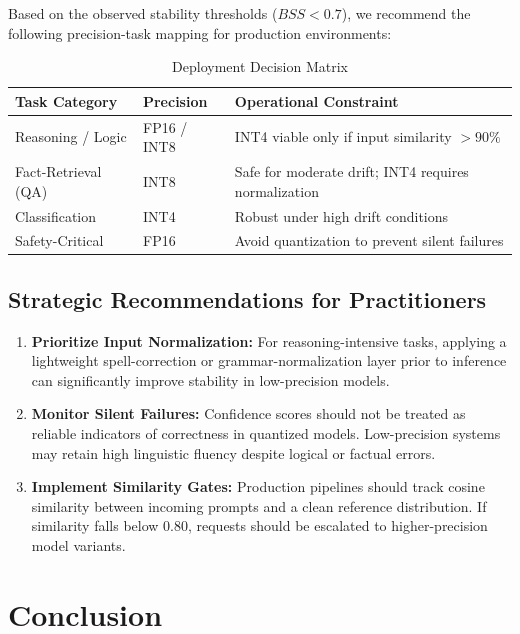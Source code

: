 \documentclass[conference]{IEEEtran}
\begin{document}
Based on the observed stability thresholds ($BSS < 0.7$), we recommend the following precision-task mapping for production environments:

\begin{table}[t]
\centering
\caption{Deployment Decision Matrix}
\begin{tabular}{|p{2.2cm}|p{2.2cm}|p{3.5cm}|}
\hline
\textbf{Task Category} & \textbf{Precision} & \textbf{Operational Constraint} \\
\hline
Reasoning / Logic & FP16 / INT8 & INT4 viable only if input similarity $> 90\%$ \\
\hline
Fact-Retrieval (QA) & INT8 & Safe for moderate drift; INT4 requires normalization \\
\hline
Classification & INT4 & Robust under high drift conditions \\
\hline
Safety-Critical & FP16 & Avoid quantization to prevent silent failures \\
\hline
\end{tabular}
\end{table}

\subsection{Strategic Recommendations for Practitioners}

\begin{enumerate}
\item \textbf{Prioritize Input Normalization:} For reasoning-intensive tasks, applying a lightweight spell-correction or grammar-normalization layer prior to inference can significantly improve stability in low-precision models.
\item \textbf{Monitor Silent Failures:} Confidence scores should not be treated as reliable indicators of correctness in quantized models. Low-precision systems may retain high linguistic fluency despite logical or factual errors.
\item \textbf{Implement Similarity Gates:} Production pipelines should track cosine similarity between incoming prompts and a clean reference distribution. If similarity falls below $0.80$, requests should be escalated to higher-precision model variants.
\end{enumerate}


\section{Conclusion}
\end{document}
